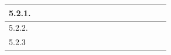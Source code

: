 \documentclass[12pt]{article}
\begin{document}
\begin{table}[H]
{\begin{tabular}{|lllllllllllllllll|}
			\multicolumn{1}{|l|}{5.2.1.}                                                       & \multicolumn{1}{l|}{}                          & \multicolumn{1}{l|}{}                          & \multicolumn{1}{l|}{}                          & \multicolumn{1}{l|}{}                          & \multicolumn{1}{l|}{}                          & \multicolumn{1}{l|}{}                          & \multicolumn{1}{l|}{}                          & \multicolumn{1}{l|}{}                          & \multicolumn{1}{l|}{}                          & \multicolumn{1}{l|}{}                           & \multicolumn{1}{l|}{\cellcolor[HTML]{CBCEFB}}   & \multicolumn{1}{l|}{}                           & \multicolumn{1}{l|}{}                           & \multicolumn{1}{l|}{}                           & \multicolumn{1}{l|}{}                           &                            \\ \hline
			\multicolumn{1}{|l|}{5.2.2.}                                                       & \multicolumn{1}{l|}{}                          & \multicolumn{1}{l|}{}                          & \multicolumn{1}{l|}{}                          & \multicolumn{1}{l|}{}                          & \multicolumn{1}{l|}{}                          & \multicolumn{1}{l|}{}                          & \multicolumn{1}{l|}{}                          & \multicolumn{1}{l|}{}                          & \multicolumn{1}{l|}{}                          & \multicolumn{1}{l|}{}                           & \multicolumn{1}{l|}{}                           & \multicolumn{1}{l|}{\cellcolor[HTML]{CBCEFB}}   & \multicolumn{1}{l|}{\cellcolor[HTML]{FFCCC9}}   & \multicolumn{1}{l|}{}                           & \multicolumn{1}{l|}{}                           &                            \\ \hline
			\multicolumn{1}{|l|}{5.2.3}                                                        & \multicolumn{1}{l|}{}                          & \multicolumn{1}{l|}{}                          & \multicolumn{1}{l|}{}                          & \multicolumn{1}{l|}{}                          & \multicolumn{1}{l|}{}                          & \multicolumn{1}{l|}{}                          & \multicolumn{1}{l|}{}                          & \multicolumn{1}{l|}{}                          & \multicolumn{1}{l|}{}                          & \multicolumn{1}{l|}{}                           & \multicolumn{1}{l|}{}                           & \multicolumn{1}{l|}{}                           & \multicolumn{1}{l|}{}                           & \multicolumn{1}{l|}{\cellcolor[HTML]{FFCCC9}}   & \multicolumn{1}{l|}{}                           &                            \\ \hline

\end{tabular}}
\end{table}
\end{document}
